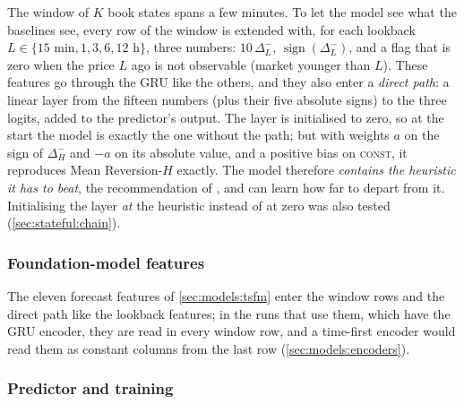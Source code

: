 The window of $K$ book states spans a few minutes.  To let the model see what the
baselines see, every row of the window is extended with, for each lookback
$L \in \{15\text{ min}, 1, 3, 6, 12\text{ h}\}$, three numbers: $10\,\Delta^{-}_{L}$,
$\operatorname{sign}(\Delta^{-}_{L})$, and a flag that is zero when the price $L$ ago is
not observable (market younger than $L$).  These features go through the GRU like the
others, and they also enter a \emph{direct path}: a linear layer from the fifteen
numbers (plus their five absolute signs) to the three logits, added to the predictor's
output.  The layer is initialised to zero, so at the start the model is exactly the one
without the path; but with weights $a$ on the sign of $\Delta^{-}_{H}$ and $-a$ on its
absolute value, and a positive bias on \textsc{const}, it reproduces Mean Reversion-$H$ exactly.  The model therefore
\emph{contains the heuristic it has to beat}, the recommendation of
\textcite{feldman2026navis}, and can learn how far to depart from it.  Initialising
the layer \emph{at} the heuristic instead of at zero was also tested
(\cref{sec:stateful:chain}).

\subsubsection{Foundation-model features}

The eleven forecast features of \cref{sec:models:tsfm} enter the window rows and the direct
path like the lookback features; in the runs that use them, which have the GRU encoder, they
are read in every window row, and a time-first encoder would read them as constant columns
from the last row (\cref{sec:models:encoders}).

\subsubsection{Predictor and training}

